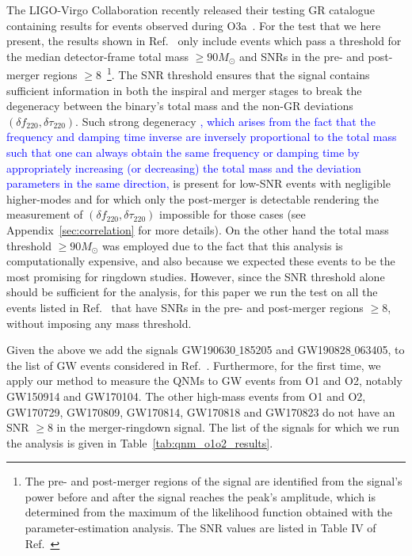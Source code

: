 \documentclass[twocolumn,prd,aps,superscriptaddress,preprintnumbers,tightenlines,showpacs,nofootinbib,eqsecnum,amsfonts,amsmath]{revtex4-1}
\newcommand{\Mo}{M_{\odot}}
\newcommand{\df}[1]{\delta f_{\text{#1}}}
\newcommand{\dtau}[1]{\delta \tau_{\text{#1}}}
\begin{document}
The LIGO-Virgo Collaboration recently released their testing GR
catalogue containing results for events observed
during O3a~\cite{Abbott:2020jks}. For the test that we here present, the results shown in Ref.~\cite{Abbott:2020jks} only include events which pass a threshold for the median detector-frame total mass $\geq 90 \Mo$ and SNRs in the pre- and
post-merger regions $\geq 8$~\footnote{The pre- and post-merger regions of the signal are identified from the signal's power before and after the signal reaches the peak's amplitude, which is determined from the maximum of the likelihood function obtained with the parameter-estimation analysis. The SNR values are listed in Table IV of Ref.~\cite{Abbott:2020jks}}. 
%
The SNR threshold ensures that the signal contains sufficient
information in both the inspiral and merger stages to break the
degeneracy between the binary's total mass and the non-GR deviations
$(\df{220}, \dtau{220})$. Such strong degeneracy \textcolor{blue}{, which arises from the fact that the frequency and damping time inverse are inversely proportional to the total mass~\cite{Berti:2005ys} such that one can always obtain the same frequency or damping time by appropriately increasing (or decreasing) the total mass and the deviation parameters in the same direction,} is present for
low-SNR events with negligible higher-modes and for which only the
post-merger is detectable rendering the measurement of $(\df{220},
\dtau{220})$ impossible for those cases (see Appendix~\ref{sec:correlation} for more details). On the other hand the
total mass threshold $\geq 90 \Mo$ was employed due to the fact that
this analysis is computationally expensive, and also because we
expected these events to be the most promising for ringdown
studies. However, since the SNR threshold alone should be sufficient
for the analysis, for this paper we run the test on all the events
listed in Ref.~\cite{Abbott:2020jks} that have SNRs in the pre- and
post-merger regions $\geq 8$, without imposing any mass threshold.

Given the above we add the signals  GW190630$\_$185205 and GW190828$\_$063405, to the list of GW events considered in Ref.~\cite{Abbott:2020jks}. Furthermore, for the first time, 
we apply our method to measure the QNMs to GW events from O1 and O2, notably GW150914 and GW170104. The other high-mass events from O1 and O2, GW170729, GW170809,
GW170814, GW170818 and GW170823 do not have an SNR $\geq 8$ in the
merger-ringdown signal. The list of the signals for which we run the analysis is given in Table~\ref{tab:qnm_o1o2_results}.
  
\end{document}
